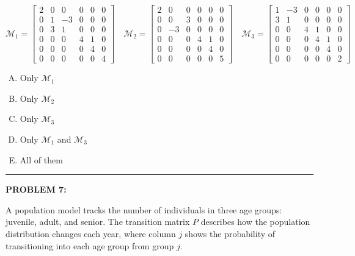 \documentclass[12pt]{amsart}
\newcommand{\divider}{
  \vspace{-1em} %
  \noindent
  \raisebox{-0.15ex}{\textbullet}%
  \hspace{0.5em}%
  \rule[0.5ex]{0.95\textwidth}{1.0pt}%
  \hspace{0.5em}%
  \raisebox{-0.15ex}{\textbullet}%
  \vspace{0em} %
}
\begin{document}
{\small
\[
\mathcal{M}_1 = \begin{bmatrix}
2 & 0 & 0 & 0 & 0 & 0 \\
0 & 1 & -3 & 0 & 0 & 0 \\
0 & 3 & 1 & 0 & 0 & 0 \\
0 & 0 & 0 & 4 & 1 & 0 \\
0 & 0 & 0 & 0 & 4 & 0 \\
0 & 0 & 0 & 0 & 0 & 4
\end{bmatrix}
\quad
\mathcal{M}_2 = \begin{bmatrix}
2 & 0 & 0 & 0 & 0 & 0 \\
0 & 0 & 3 & 0 & 0 & 0 \\
0 & -3 & 0 & 0 & 0 & 0 \\
0 & 0 & 0 & 4 & 1 & 0 \\
0 & 0 & 0 & 0 & 4 & 0 \\
0 & 0 & 0 & 0 & 0 & 5
\end{bmatrix}
\quad
\mathcal{M}_3 = \begin{bmatrix}
1 & -3 & 0 & 0 & 0 & 0 \\
3 & 1 & 0 & 0 & 0 & 0 \\
0 & 0 & 4 & 1 & 0 & 0 \\
0 & 0 & 0 & 4 & 1 & 0 \\
0 & 0 & 0 & 0 & 4 & 0 \\
0 & 0 & 0 & 0 & 0 & 2
\end{bmatrix}
\]
}

\begin{enumerate}[(A)]
\item Only $\mathcal{M}_1$
\item Only $\mathcal{M}_2$
\item Only $\mathcal{M}_3$
\item Only $\mathcal{M}_1$ and $\mathcal{M}_3$
\item All of them
\end{enumerate}


\divider


{\bf PROBLEM 7:}

A population model tracks the number of individuals in three age groups: juvenile, adult, and senior. The transition matrix $P$ describes how the population distribution changes each year, where column $j$ shows the probability of transitioning into each age group from group $j$.
\end{document}
